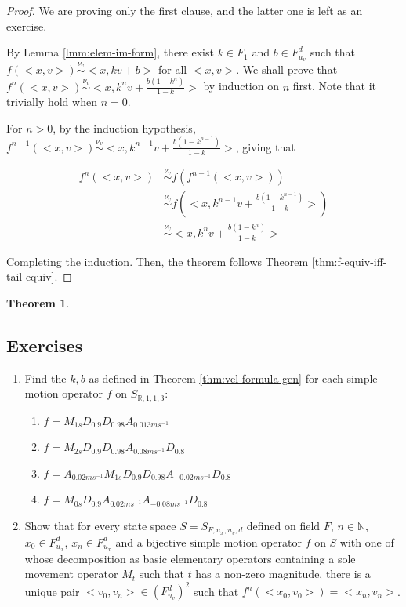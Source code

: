 \documentclass{book}
\newtheorem{theorem}{Theorem}
\theoremstyle{definition}\newtheorem{mechanism}{Mechanism}
\theoremstyle{remark}\newtheorem*{remark}{Remark}
\begin{document}
\begin{proof}
	We are proving only the first clause, and the latter one is left as an exercise.
	
	By Lemma \ref{lmm:elem-im-form}, there exist $k\in F_1$ and $b\in F_{u_v}^d$ such that $f(<x, v>)\overset{\nu_v}{\sim} <x, kv + b>$ for all $<x, v>$. We shall prove that $f^n(<x, v>) \overset{\nu_v}{\sim} <x, k^nv + \frac{b(1 - k^n)}{1 - k}>$ by induction on $n$ first. Note that it trivially hold when $n = 0$.
	
	For $n > 0$, by the induction hypothesis, $f^{n - 1}(<x, v>) \overset{\nu_v}{\sim} <x, k^{n - 1}v + \frac{b(1 - k^{n - 1})}{1 - k}>$, giving that
	
	\begin{align*}
		f^n(<x, v>) & \overset{\nu_v}{\sim} f(f^{n - 1}(<x, v>))\\
		& \overset{\nu_v}{\sim} f\left(<x, k^{n - 1}v + \frac{b(1 - k^{n - 1})}{1 - k}>\right)\\
		& \overset{\nu_v}{\sim} <x, k^nv + \frac{b(1 - k^n)}{1-k}>
	\end{align*}
	
	Completing the induction. Then, the theorem follows Theorem \ref{thm:f-equiv-iff-tail-equiv}.
\end{proof}

\begin{theorem}
	
\end{theorem}

\subsection*{Exercises}

\begin{enumerate}
	\item Find the $k, b$ as defined in Theorem \ref{thm:vel-formula-gen} for each simple motion operator $f$ on $S_{\mathbb R, 1, 1, 3}$:
	\begin{enumerate}
		\item $f = M_{1s}D_{0.9}D_{0.98}A_{0.013ms^{-1}}$
		\item $f = M_{2s}D_{0.9}D_{0.98}A_{0.08ms^{-1}}D_{0.8}$
		\item $f = A_{0.02ms^{-1}}M_{1s}D_{0.9}D_{0.98}A_{-0.02ms^{-1}}D_{0.8}$
		\item $f = M_{0s}D_{0.9}A_{0.02ms^{-1}}A_{-0.08ms^{-1}}D_{0.8}$
	\end{enumerate}
	\item Show that for every state space $S = S_{F, u_x, u_v, d}$ defined on field $F$, $n\in \mathbb N$, $x_0\in F_{u_x}^d$, $x_n \in F_{u_x}^d$ and a bijective simple motion operator $f$ on $S$ with one of whose decomposition as basic elementary operators containing a sole movement operator $M_{t}$ such that $t$ has a non-zero magnitude, there is a unique pair $<v_0, v_n>\in (F_{u_v}^d)^2$ such that $f^n(<x_0, v_0>) = <x_n, v_n>$.
\end{enumerate}
\end{document}
